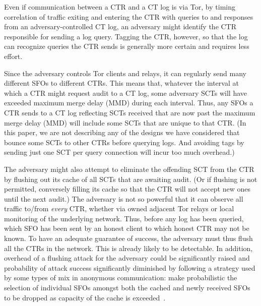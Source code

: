 
Even if communication between a CTR and a CT log is
via Tor, by timing correlation of traffic exiting and entering the CTR
with queries to and responses from an adversary-controlled CT log, an
adversary might identify the CTR responsible for sending a log
query. Tagging the CTR, however, so that the log can recognize queries
the CTR sends is generally more certain and requires less effort.

 Since the adversary controls Tor clients and
relays, it can regularly send many different SFOs to different
CTRs. This means that, whatever the interval at which a CTR might
request audit to a CT log, some adversary SCTs will have exceeded
maximum merge delay (MMD) during each interval.  Thus, any SFOs a CTR
sends to a CT log reflecting SCTs received that are now past the
maximum merge delay (MMD) will include some SCTs that are unique to
that CTR\@. (In this paper, we are not describing any of the designs
we have considered that bounce some SCTs to other CTRs before querying
logs. And avoiding tags by sending just one SCT per query connection
will incur too much overhead.)

 The adversary might also attempt to
eliminate the offending SCT from the CTR by flushing out its cache of
all SCTs that are awaiting audit\@. (Or if flushing is not permitted,
conversely filling its cache so that the CTR will not accept new ones
until the next audit.) 
The adversary is not so powerful that it can observe all traffic to/from
\emph{every} CTR, whether via owned adjacent Tor relays or local
monitoring of the underlying network.  Thus, before any log has been
queried, which SFO has been sent by an honest client to which honest
CTR may not be known. To have an adequate guarantee of success, the
adversary must thus flush all the CTRs in the network. This is already
likely to be detectable. In addition, overhead of a flushing attack for the
adversary could be significantly raised and probability of attack
success significantly diminished by following a strategy used by some
types of mix in anonymous communication: make probabilistic the
selection of individual SFOs amongst both the cached and newly
received SFOs to be dropped as capacity of the cache is
exceeded~\cite{trickle02}.



